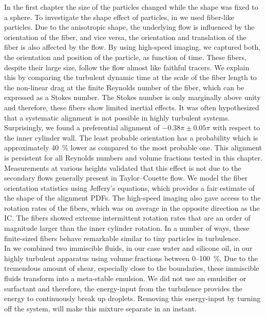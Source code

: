 \indent In the first chapter the size of the particles changed while the shape
was fixed to a sphere.
To investigate the shape effect of particles, in  we used
fiber-like particles.
Due to the anisotropic shape, the underlying flow is influenced by the
orientation of the fiber, and vice versa, the orientation and translation of
the fiber is also affected by the flow.
By using high-speed imaging, we captured both, the orientation and position of
the particle, as function of time.
These fibers, despite their large size, follow the flow almost like
faithful tracers.
We explain this by comparing the turbulent dynamic time at the scale of the
fiber length to the non-linear drag at the finite Reynolds number of the
fiber, which can be expressed as a Stokes number.
The Stokes number is only marginally above unity and therefore, these fibers
show limited inertial effects. 
It was often hypothesized that a systematic alignment is not possible in
highly turbulent systems.
Surprisingly, we found a preferential alignment of $-0.38\pi \pm 0.05\pi$ with
respect to the inner cylinder wall.
The least probable orientation has a probability which is approximately
\SI{40}{\percent} lower as compared to the most probable one.
This alignment is persistent for all Reynolds numbers and volume fractions
tested in this chapter.
Measurements at various heights validated that this effect is not due to the
secondary flows generally present in Taylor--Couette flow.
We model the fiber orientation statistics using Jeffery's equations, which
provides a fair estimate of the shape of the alignment PDFs.
The high-speed imaging also gave access to the rotation rates of the fibers,
which was on average in the opposite direction as the IC.  
The fibers showed extreme intermittent rotation rates that are an order of
magnitude larger than the inner cylinder rotation.
In a number of ways, these finite-sized fibers behave remarkable similar to
tiny particles in turbulence.\\
\indent In  we combined two immiscible fluids, in our
case water and silicone oil, in
our highly turbulent apparatus using volume fractions between
0--\SI{100}{\percent}.
Due to the tremendous amount of shear, especially close to the boundaries,
these immiscible fluids transform into a meta-stable emulsion.
We did not use an emulsifier or surfactant and therefore, the energy-input
from the turbulence provides the energy to continuously break up droplets.
Removing this energy-input by turning off the system, will make this mixture
separate in an instant.
